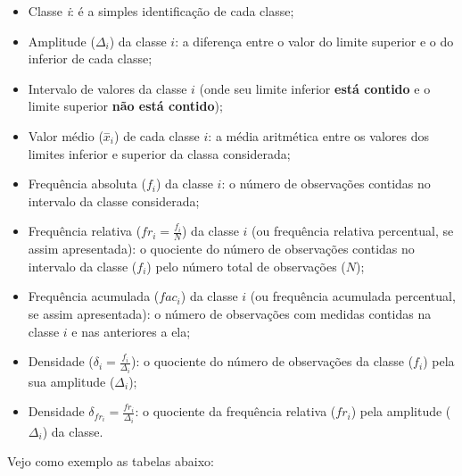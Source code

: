 \documentclass[
]{book}
\providecommand{\tightlist}{%
  \setlength{\itemsep}{0pt}\setlength{\parskip}{0pt}}
\begin{document}
\begin{itemize}
\tightlist
\item
  Classe \emph{i}: é a simples identificação de cada classe;
\item
  Amplitude (\(\Delta_{i}\)) da classe \(i\): a diferença entre o valor do limite superior e o do inferior de cada classe;
\item
  Intervalo de valores da classe \(i\) (onde seu limite inferior \textbf{está contido} e o limite superior \textbf{não está contido});
\item
  Valor médio (\(\stackrel{-}{x}_{i}\)) de cada classe \(i\): a média aritmética entre os valores dos limites inferior e superior da classa considerada;
\item
  Frequência absoluta (\(f_{i}\)) da classe \(i\): o número de observações contidas no intervalo da classe considerada;
\item
  Frequência relativa (\(fr_{i}= \frac{f_{i}}{N}\)) da classe \(i\) (ou frequência relativa percentual, se assim apresentada): o quociente do número de observações contidas no intervalo da classe (\(f_{i}\)) pelo número total de observações (\(N\));
\item
  Frequência acumulada (\(fac_{i}\)) da classe \(i\) (ou frequência acumulada percentual, se assim apresentada): o número de observações com medidas contidas na classe \(i\) e nas anteriores a ela;
\item
  Densidade (\(\delta_{i}=\frac{f_{i}}{\Delta_{i}}\)): o quociente do número de observações da classe (\(f_{i}\)) pela sua amplitude (\(\Delta_{i}\));
\item
  Densidade \(\delta_{fr_{i}}=\frac{fr_{i}}{\Delta_{i}}\): o quociente da frequência relativa (\(fr_{i}\)) pela amplitude (\(\Delta_{i}\)) da classe.
\end{itemize}

\hfill\break

Vejo como exemplo as tabelas abaixo:

\hfill\break
\end{document}

